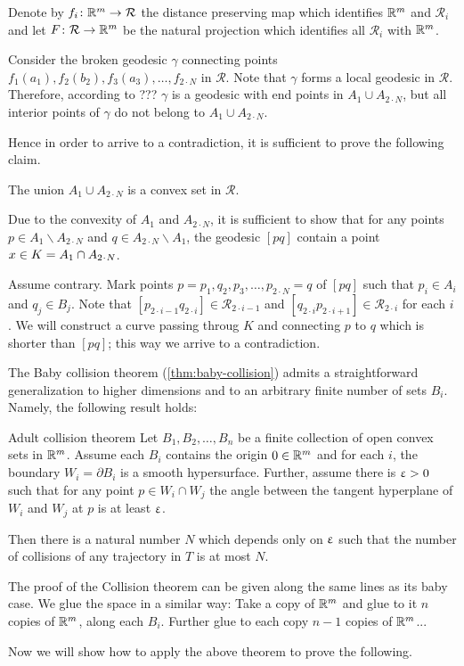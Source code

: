 Denote by $f_i\:\RR^m\to\mathcal{R}$ the distance preserving map which identifies $\mathbb{R}^m$ and $\mathcal{R}_i$
and let $F\:\mathcal{R} \to \RR^m$ be the natural projection which identifies all $\mathcal{R}_i$ with $\mathbb{R}^m$.

Consider the broken geodesic $\gamma$ connecting points $f_1(a_1),f_2(b_2),f_3(a_3),\dots,f_{2\cdot N}$ in $\mathcal{R}$.
Note that $\gamma$ forms a local geodesic in $\mathcal{R}$.
Therefore, according to ??? $\gamma$ is a geodesic with end points in $A_1\cup A_{2\cdot N}$,
but all interior points of $\gamma$ do not belong to $A_1\cup A_{2\cdot N}$.

Hence in order to arrive to a contradiction, 
it is sufficient to prove the following claim.
 
\begin{clm}{}
The union $A_1\cup A_{2\cdot N}$ is a convex set in $\mathcal{R}$.
\end{clm}

Due to the convexity of $A_1$ and $A_{2\cdot N}$,
it is sufficient to show that for any points $p\in A_1\backslash A_{2\cdot N}$ and $q\in A_{2\cdot N}\backslash A_1$,
the geodesic $[pq]$ contain a point $x\in K\z=A_1\cap A_{2\cdot N}$.

Assume contrary.
Mark points $p=p_1,q_2,p_3,\dots,p_{2\cdot N}=q$ of $[pq]$ such that $p_i\in A_i$ and $q_j\in B_j$.
Note that $[p_{2\cdot i-1}q_{2\cdot i}]\in \mathcal{R}_{2\cdot i-1}$ 
and 
$[q_{2\cdot i}p_{2\cdot i+1}]\in \mathcal{R}_{2\cdot i}$ for each $i$.
We will construct a curve passing throug $K$ and connecting $p$ to $q$ which is shorter than $[pq]$;
this way we arrive to a contradiction. 







\qeds

The Baby collision theorem (\ref{thm:baby-collision}) admits a straightforward generalization to higher dimensions and to an arbitrary finite number of sets $B_i$.
Namely, the following result holds:

\begin{thm}{Adult collision theorem}\label{thm:adult-collision}
Let $B_1,B_2,\dots,B_n$ be a finite collection of open convex sets in $\mathbb{R}^m$.
Assume each $B_i$ contains the origin $0\in\RR^m$
and for each $i$, the boundary $W_i=\partial B_i$ is a smooth hypersurface.
Further, assume there is $\upvarepsilon>0$ such that for any point $p\in W_i\cap W_j$ the angle between the tangent 
hyperplane of $W_i$ and $W_j$ at $p$ is at least $\upvarepsilon$.

Then 
there is a natural number $N$ which depends only on $\upvarepsilon$
such that the number of collisions of any trajectory in $T$ is at most $N$.
\end{thm}

The proof of the Collision theorem can be given along the same lines as its baby case.
We glue the space in a similar way:
Take a copy of $\mathbb{R}^m$
and glue to it $n$ copies of $\mathbb{R}^m$, along each $B_i$.
Further glue to each copy $n-1$ copies of $\mathbb{R}^m$... 

Now we will show how to apply the above theorem to prove the following. 